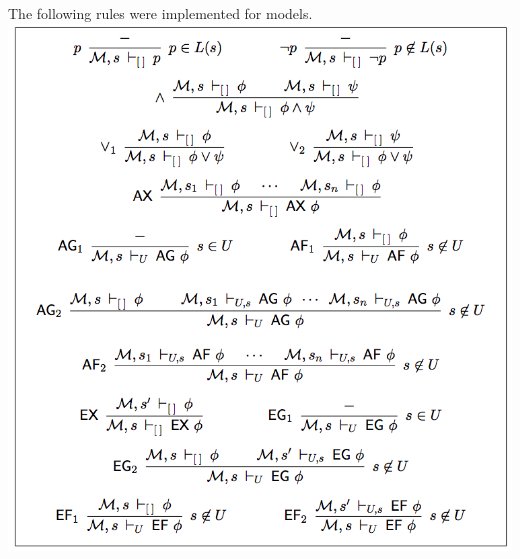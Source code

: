 \documentclass[a4paper,11pt]{article}
\begin{document}
The following rules were implemented for models.
\newline
\includegraphics[scale=0.48]{rules.png}
\newpage
\end{document}
